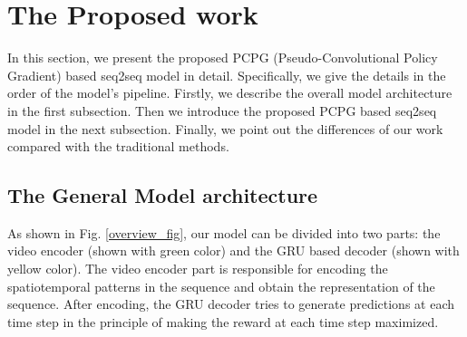 \documentclass[a4paper, 10pt, conference]{ieeeconf}      %
\begin{document}
	
	\section{The Proposed work}
	\label{sec:Pro}
	In this section, we present the proposed PCPG (Pseudo-Convolutional Policy Gradient) based seq2seq model in detail. Specifically, we give the details in the order of the model's pipeline. Firstly, we describe the overall model architecture in the first subsection. Then we introduce the proposed PCPG based seq2seq model in the next subsection. Finally, we point out the differences of our work compared with the traditional methods.
	
	\subsection{The General Model architecture} \label{section3.1}
	As shown in Fig. \ref{overview_fig}, our model can be divided into two parts: the video encoder (shown with green color) and the GRU based decoder (shown with yellow color). The video encoder part is responsible for encoding the spatiotemporal patterns in the sequence and obtain the representation of the sequence. After encoding, the GRU decoder tries to generate predictions at each time step in the principle of making the reward at each time step maximized.
	
\end{document}
